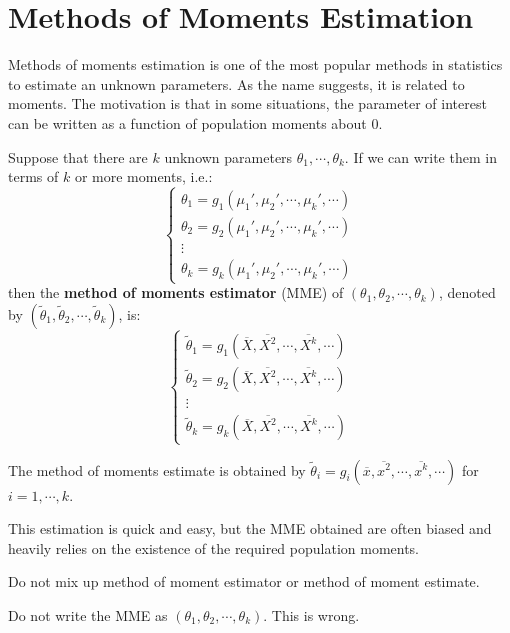 \documentclass{huhtakm-template-book-v2}
\begin{document}
\section{Methods of Moments Estimation}
Methods of moments estimation is one of the most popular methods in statistics to estimate an unknown parameters. As the name suggests, it is related to moments. The motivation is that in some situations, the parameter of interest can be written as a function of population moments about $0$.
\begin{defn}
	Suppose that there are $k$ unknown parameters $\theta_{1},\cdots,\theta_{k}$. If we can write them in terms of $k$ or more moments, i.e.:
	\begin{equation*}
		\begin{cases}
			\theta_{1}=g_{1}(\mu_{1}',\mu_{2}',\cdots,\mu_{k}',\cdots)\\
			\theta_{2}=g_{2}(\mu_{1}',\mu_{2}',\cdots,\mu_{k}',\cdots)\\
			\vdots\\
			\theta_{k}=g_{k}(\mu_{1}',\mu_{2}',\cdots,\mu_{k}',\cdots)
		\end{cases}
	\end{equation*}
	then the \textbf{method of moments estimator} (MME) of $(\theta_{1},\theta_{2},\cdots,\theta_{k})$, denoted by $(\widetilde{\theta}_{1},\widetilde{\theta}_{2},\cdots,\widetilde{\theta}_{k})$, is:
	\begin{equation*}
		\begin{cases}
			\widetilde{\theta}_{1}=g_{1}(\overline{X},\overline{X^{2}},\cdots,\overline{X^{k}},\cdots)\\
			\widetilde{\theta}_{2}=g_{2}(\overline{X},\overline{X^{2}},\cdots,\overline{X^{k}},\cdots)\\
			\vdots\\
			\widetilde{\theta}_{k}=g_{k}(\overline{X},\overline{X^{2}},\cdots,\overline{X^{k}},\cdots)
		\end{cases}
	\end{equation*}
\end{defn}
\begin{rem}
	The method of moments estimate is obtained by $\widetilde{\theta}_{i}=g_{i}(\overline{x},\overline{x^{2}},\cdots,\overline{x^{k}},\cdots)$ for $i=1,\cdots,k$.
\end{rem}
\begin{rem}
	This estimation is quick and easy, but the MME obtained are often biased and heavily relies on the existence of the required population moments.
\end{rem}
\begin{rem}
	Do not mix up method of moment estimator or method of moment estimate.
\end{rem}
\begin{rem}
	Do not write the MME as $(\theta_{1},\theta_{2},\cdots,\theta_{k})$. This is wrong.
\end{rem}
\end{document}

